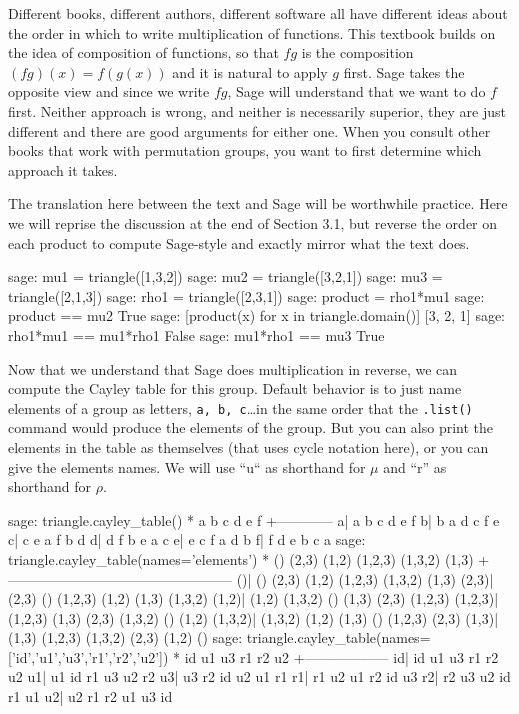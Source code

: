%
Different books, different authors, different software all have different ideas about the order in which to write multiplication of functions.  This textbook builds on the idea of composition of functions, so that $fg$ is the composition $(fg)(x)=f(g(x))$ and it is natural to apply $g$ first.  Sage takes the opposite view and since we write $fg$, Sage will understand that we want to do $f$ first.  Neither approach is wrong, and neither is necessarily superior, they are just different and there are good arguments for either one.  When you consult other books that work with permutation groups, you want to first determine which approach it takes.\par
%
The translation here between the text and Sage will be worthwhile practice.  Here we will reprise the discussion at the end of Section 3.1, but reverse the order on each product to compute Sage-style and exactly mirror what the text does.
%
\begin{sageexample}
sage: mu1 = triangle([1,3,2])
sage: mu2 = triangle([3,2,1])
sage: mu3 = triangle([2,1,3])
sage: rho1 = triangle([2,3,1])
sage: product = rho1*mu1
sage: product == mu2
True
sage: [product(x) for x in triangle.domain()]
[3, 2, 1]
sage: rho1*mu1 == mu1*rho1
False
sage: mu1*rho1 == mu3
True
\end{sageexample}
%
Now that we understand that Sage does multiplication in reverse, we can compute the Cayley table for this group.  Default behavior is to just name elements of a group as letters, \verb?a, b, c?\dots in the same order that the \verb?.list()? command would produce the elements of the group.  But you can also print the elements in the table as themselves (that uses cycle notation here), or you can give the elements names.  We will use ``u`` as shorthand for $\mu$ and ``r'' as shorthand for $\rho$.
%
\begin{sageexample}
sage: triangle.cayley_table()
*  a b c d e f
 +------------
a| a b c d e f
b| b a d c f e
c| c e a f b d
d| d f b e a c
e| e c f a d b
f| f d e b c a
sage: triangle.cayley_table(names='elements')
      *       ()   (2,3)   (1,2) (1,2,3) (1,3,2)   (1,3)
       +------------------------------------------------
     ()|      ()   (2,3)   (1,2) (1,2,3) (1,3,2)   (1,3)
  (2,3)|   (2,3)      () (1,2,3)   (1,2)   (1,3) (1,3,2)
  (1,2)|   (1,2) (1,3,2)      ()   (1,3)   (2,3) (1,2,3)
(1,2,3)| (1,2,3)   (1,3)   (2,3) (1,3,2)      ()   (1,2)
(1,3,2)| (1,3,2)   (1,2)   (1,3)      () (1,2,3)   (2,3)
  (1,3)|   (1,3) (1,2,3) (1,3,2)   (2,3)   (1,2)      ()
sage: triangle.cayley_table(names=['id','u1','u3','r1','r2','u2'])
 *  id u1 u3 r1 r2 u2
  +------------------
id| id u1 u3 r1 r2 u2
u1| u1 id r1 u3 u2 r2
u3| u3 r2 id u2 u1 r1
r1| r1 u2 u1 r2 id u3
r2| r2 u3 u2 id r1 u1
u2| u2 r1 r2 u1 u3 id
\end{sageexample}
